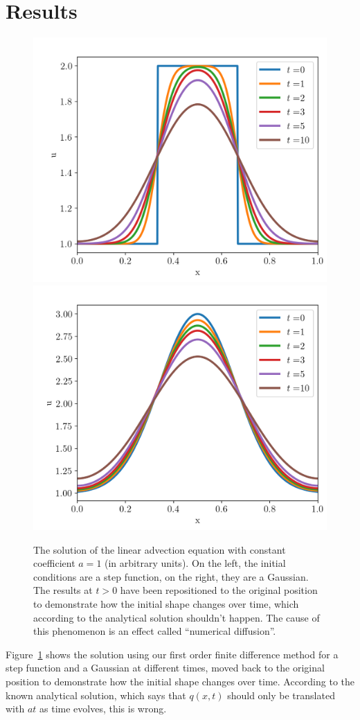 \section{Results}

\begin{figure}
    \centering
    \includegraphics[width=.5\textwidth]{
    ./figures/advection-1D-step.png}%
    \includegraphics[width=.5\textwidth]{
    ./figures/advection-1D-gaussian.png}%
    \caption{
The solution of the linear advection equation with constant coefficient $a = 1$ (in arbitrary
units). On the left, the initial conditions are a step function, on the right, they are a
Gaussian. The results at $t > 0$ have been repositioned to the original position to demonstrate
how the initial shape changes over time, which according to the analytical solution shouldn't
happen. The cause of this phenomenon is an effect called ``numerical diffusion''.
    }%
    \label{fig:linear-advection-results}
\end{figure}

Figure~\ref{fig:linear-advection-results} shows the solution using our first
order finite difference method for a step function and a Gaussian at different
times, moved back to the original position to demonstrate how the initial shape
changes over time. According to the known analytical solution, which says that
$q(x, t)$ should only be translated with $a t$ as time evolves, this is wrong.

